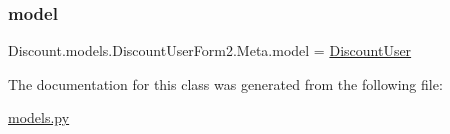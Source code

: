 \mbox{\label{class_discount_1_1models_1_1_discount_user_form2_1_1_meta_afd9d229cc546924bd1276d55221335ce}} 
\subsubsection{\texorpdfstring{model}{model}}
{\footnotesize\ttfamily Discount.\+models.\+Discount\+User\+Form2.\+Meta.\+model = \hyperlink{class_discount_1_1models_1_1_discount_user}{Discount\+User}\hspace{0.3cm}{\ttfamily [static]}}



The documentation for this class was generated from the following file\+:\begin{DoxyCompactItemize}
\item 
\hyperlink{models_8py}{models.\+py}\end{DoxyCompactItemize}
